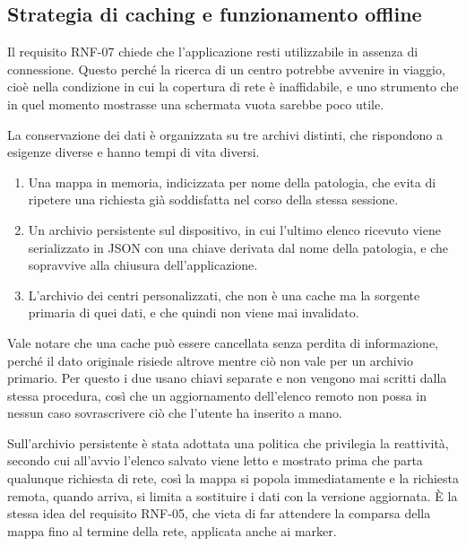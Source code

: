 \subsection{Strategia di caching e funzionamento offline}\label{subsec:strategia-cache}

Il requisito RNF-07 chiede che l'applicazione resti utilizzabile in assenza di connessione.
Questo perché la ricerca di un centro potrebbe avvenire in viaggio, cioè nella condizione in cui
la copertura di rete è inaffidabile, e uno strumento che in quel momento mostrasse una schermata vuota sarebbe poco utile.

La conservazione dei dati è organizzata su tre archivi distinti, che rispondono a esigenze diverse e hanno tempi di vita diversi.

\begin{enumerate}
    \item Una mappa in memoria, indicizzata per nome della patologia, che evita di ripetere una richiesta già soddisfatta nel
    corso della stessa sessione.
    \item Un archivio persistente sul dispositivo, in cui l'ultimo elenco ricevuto viene serializzato in JSON con una chiave
    derivata dal nome della patologia, e che sopravvive alla chiusura dell'applicazione.
    \item L'archivio dei centri personalizzati, che non è una cache ma la sorgente primaria di quei dati, e che quindi non
    viene mai invalidato.
\end{enumerate}

Vale notare che una cache può essere cancellata senza perdita di informazione, perché il dato originale risiede altrove
mentre ciò non vale per un archivio primario.
Per questo i due usano chiavi separate e non vengono mai scritti dalla stessa procedura, così che un aggiornamento dell'elenco
remoto non possa in nessun caso sovrascrivere ciò che l'utente ha inserito a mano.

Sull'archivio persistente è stata adottata una politica che privilegia la reattività, secondo cui all'avvio l'elenco salvato
viene letto e mostrato prima che parta qualunque richiesta di rete, così la mappa si popola immediatamente e la richiesta remota, quando arriva,
si limita a sostituire i dati con la versione aggiornata.
È la stessa idea del requisito RNF-05, che vieta di far attendere la comparsa della mappa fino al termine della rete, applicata anche ai marker.



